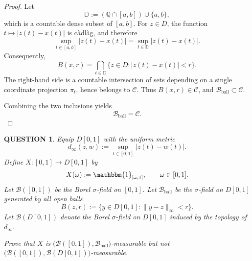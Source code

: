 \documentclass[12pt]{article}
\renewcommand{\(}{\left(}%
\renewcommand{\)}{\right)}%
\renewcommand{\[}{\left[}%
\renewcommand{\]}{\right]}%
\newtheorem{question}{QUESTION}[section]}
\newtheorem{proof}{Proof.}}
\begin{document}
\begin{proof}
Let
\begin{equation*}
\mathbb D := (\mathbb Q\cap[a,b])\cup\{a,b\},
\end{equation*}
which is a countable dense subset of $[a,b]$.
For $z\in D$, the function $t\mapsto|z(t)-x(t)|$ is c\`adl\`ag, and therefore
\begin{equation*}
\sup_{t\in[a,b]}|z(t)-x(t)|
=
\sup_{t\in\mathbb D}|z(t)-x(t)|.
\end{equation*}
Consequently,
\begin{equation*}
B(x,r)
=
\bigcap_{t\in\mathbb D}
\{z\in D:|z(t)-x(t)|<r\}.
\end{equation*}
The right-hand side is a countable intersection of sets depending on a single
coordinate projection $\pi_t$, hence belongs to $\mathcal C$.
Thus $B(x,r)\in\mathcal C$, and $\mathcal B_{\mathrm{ball}}\subset\mathcal C$.

\medskip
Combining the two inclusions yields
\begin{equation*}
\mathcal B_{\mathrm{ball}}=\mathcal C.
\end{equation*}
\end{proof}

\begin{question}
Equip $D[0,1]$ with the uniform metric
\begin{equation*}
d_\infty(z,w):=\sup_{t\in[0,1]}|z(t)-w(t)|.
\end{equation*}
Define $X:[0,1]\to D[0,1]$ by
\begin{equation*}
X(\omega):=\mathbbm{1}_{[\omega,1]}, \qquad \omega\in[0,1].
\end{equation*}
Let $\mathcal B([0,1])$ be the Borel $\sigma$-field on $[0,1]$.
Let $\mathcal B_{\mathrm{ball}}$ be the $\sigma$-field on $D[0,1]$ generated by all open balls
\begin{equation*}
B(z,r):=\{y\in D[0,1]:\|y-z\|_\infty<r\}.
\end{equation*}
Let $\mathcal B(D[0,1])$ denote the Borel $\sigma$-field on $D[0,1]$ induced by the topology of $d_\infty$.

Prove that $X$ is $\big(\mathcal B([0,1]),\mathcal B_{\mathrm{ball}}\big)$-measurable but not
$\big(\mathcal B([0,1]),\mathcal B(D[0,1])\big)$-measurable.
\end{question}
\end{document}
